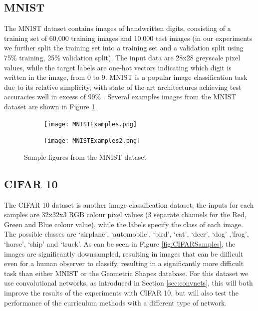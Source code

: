 \subsection{MNIST}\label{MNIST}
The MNIST dataset \cite{lecun-mnisthandwrittendigit-2010} contains images of handwritten digits, consisting of a training set of 60,000 training images and 10,000 test images (in our experiments we further split the training set into a training set and a validation split using 75\% training, 25\% validation split). The input data are 28x28 greyscale pixel values, while the target labels are one-hot vectors indicating which digit is written in the image, from 0 to 9. MNIST is a popular image classification task due to its relative simplicity, with state of the art architectures achieving test accuracies well in excess of 99\% \cite{wan2013regularization}. Several examples images from the MNIST dataset are shown in Figure \ref{fig:MNISTSamples}.
\begin{figure}[h!]
\hspace*{-2cm}    
\centering
\begin{subfigure}{.6\textwidth}
  \centering
  \texttt{[image: MNISTExamples.png]}
\end{subfigure}%
\begin{subfigure}{.6\textwidth}
  \centering
  \texttt{[image: MNISTExamples2.png]}
\end{subfigure}
\caption{Sample figures from the MNIST dataset}
\label{fig:MNISTSamples}
\end{figure}
\subsection{CIFAR 10}\label{CIFAR10}
The CIFAR 10 dataset \cite{krizhevsky2009learning} is another image classification dataset; the inputs for each samples are 32x32x3 RGB colour pixel values (3 separate channels for the Red, Green and Blue colour value), while the labels specify the class of each image. The possible classes are `airplane', `automobile', `bird', `cat', `deer', `dog' ,'frog', `horse', `ship' and `truck'. As can be seen in Figure \ref{fig:CIFARSamples}, the images are significantly downsampled, resulting in images that can be difficult even for a human observer to classify, resulting in a significantly more difficult task than either MNIST or the Geometric Shapes database. For this dataset we use convolutional networks, as introduced in Section \ref{sec:convnets}, this will both improve the results of the experiments with CIFAR 10, but will also test the performance of the curriculum methods with a different type of network.

